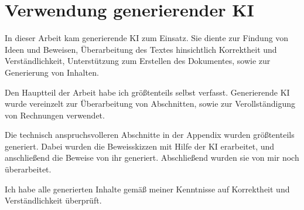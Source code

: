 \documentclass[../../main.tex]{subfiles}
\begin{document}
\chapter*{Verwendung generierender KI}
In dieser Arbeit kam generierende KI zum Einsatz. Sie diente zur Findung von Ideen und Beweisen, Überarbeitung des Textes hinsichtlich Korrektheit und Verständlichkeit, Unterstützung zum Erstellen des Dokumentes, sowie zur Generierung von Inhalten.

Den Hauptteil der Arbeit habe ich größtenteils selbst verfasst. Generierende KI wurde vereinzelt zur Überarbeitung von Abschnitten, sowie zur Verollständigung von Rechnungen verwendet.

Die technisch anspruchsvolleren Abschnitte in der Appendix wurden größtenteils generiert. Dabei wurden die Beweisskizzen mit Hilfe der KI erarbeitet, und anschließend die Beweise von ihr generiert. Abschließend wurden sie von mir noch überarbeitet.

Ich habe alle generierten Inhalte gemäß meiner Kenntnisse auf Korrektheit und Verständlichkeit überprüft.
\end{document}
